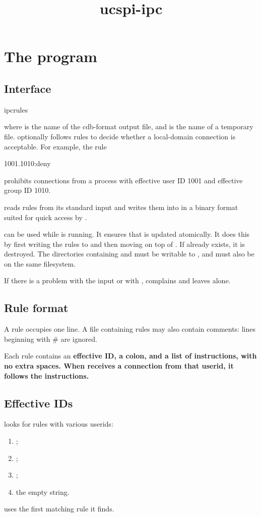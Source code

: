 \documentclass{book}
\title{ucspi-ipc}
\begin{document}
\section{The  program}

\subsection{Interface}
\begin{code}%
  ipcrules  
\end{code}
where  is the name of the cdb-format output file, and
 is the name of a temporary file.
 optionally follows rules to decide whether a
local-domain connection is acceptable.  For example, the rule
\begin{code}%
  1001.1010:deny
\end{code}
prohibits connections from a process with effective user ID 1001 and
effective group ID 1010.

 reads rules from its standard input and writes them
into  in a binary format suited for quick access by
.

 can be used while  is running.  It
ensures that  is updated atomically.  It does this by first
writing the rules to  and then moving  on top of
.  If  already exists, it is destroyed.  The
directories containing  and  must be writable to
, and must also be on the same filesystem.

If there is a problem with the input or with , 
complains and leaves  alone.

\subsection{Rule format}
A rule occupies one line.  A file containing rules may also contain
comments: lines beginning with # are ignored.

Each rule contains an \bf{effective ID}, a colon, and a list of
\bf{instructions}, with no extra spaces.  When 
receives a connection from that userid, it follows the instructions.

\subsection{Effective IDs}
 looks for rules with various userids:
\begin{enumerate}
\item {};
\item {};
\item {};
\item the empty string.
\end{enumerate}
 uses the first matching rule it finds.
\end{document}
